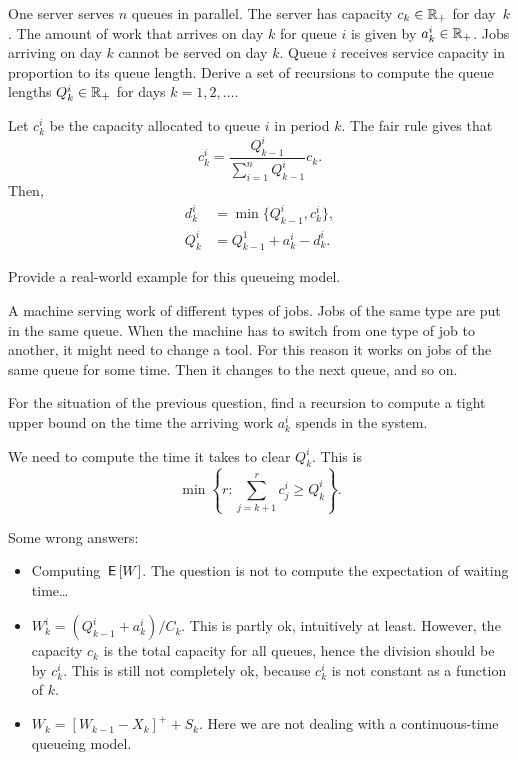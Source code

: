 \begin{exercise}[201704] One server serves $n$ queues in parallel. The
  server has capacity $c_k\in \mathbb{R}_+$ for day~$k$.  The amount of work
  that arrives on day $k$ for queue $i$ is given by $a_k^i\in \mathbb{R}_+$.
  Jobs arriving on day $k$ cannot be served on day $k$. Queue $i$
  receives service capacity in proportion to its queue length.  Derive
  a set of recursions  to compute the queue lengths $Q_k^i \in \mathbb{R}_+$ for days $k=1,2,\ldots$. 
\begin{solution}
    Let $c_k^i$ be the capacity allocated to queue $i$ in period $k$. The fair rule gives that 
    \begin{equation*}
      c_k^i = \frac{Q_{k-1}^i}{\sum_{i=1}^n Q_{k-1}^i } c_k.
    \end{equation*}
Then, 
\begin{equation*}
  \begin{split}
      d_k^i &= \min\{Q_{k-1}^i, c^i_k\}, \\
Q_k^i &= Q_{k-1}^1+a_k^i  - d_k^i.
  \end{split}
\end{equation*}
\end{solution}
  \end{exercise}

\begin{exercise}[201704]
  Provide a real-world example for this queueing model.
\begin{solution}
A machine serving work of different types of jobs. Jobs of the same type are put in the same queue. When the machine has to switch from one type of job to another, it might need to change a tool. For this reason it works on jobs of the same queue for some time. Then it changes to the next queue, and so on. 
\end{solution}
\end{exercise}

\begin{exercise}[201704]{2} For the situation of the previous question, find a recursion to compute a tight upper bound on the time the arriving work $a_k^i$ spends in the system.
\begin{solution}
We need to compute the time it takes to clear $Q_k^i$. This is
\begin{equation*}
  \min\left\{r: \sum_{j=k+1}^r c_j^i \geq Q_k^i\right\}.
\end{equation*}

Some wrong answers:
\begin{itemize}
\item Computing $\,\mathsf{E}\left[W\right]$. The question is not to compute the expectation of waiting time\ldots
\item $W_k^i=(Q_{k-1}^i+a_k^i)/C_k$. This is partly ok, intuitively at least. However, the capacity $c_k$ is the total capacity for all queues, hence the division should be by $c_k^i$. This is still not completely ok, because $c_k^i$ is not constant as a function of $k$.
\item $W_k = [W_{k-1}-X_k]^+ + S_k$. Here we are not dealing with a continuous-time queueing model. 
\end{itemize}
\end{solution}
\end{exercise}


